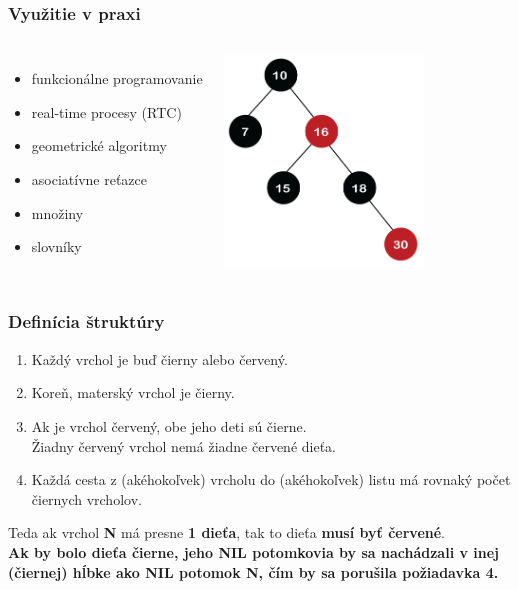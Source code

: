 \documentclass{beamer}
\begin{document}
    \begin{frame}
        \frametitle{Využitie v praxi}
        \begin{columns}
            \begin{itemize}
                \item funkcionálne programovanie
                \item real-time procesy (RTC)
                \item geometrické algoritmy
                \vspace{20pt}
                \item asociatívne reťazce
                \item množiny
                \item slovníky
            \end{itemize}
            \includegraphics[width=150pt]{rbt17}
        \end{columns}
    \end{frame}

    \begin{frame}
        \frametitle{Definícia štruktúry}
        \begin{enumerate}
            \item Každý vrchol je buď čierny alebo červený.
            \item Koreň, materský vrchol je čierny.
            \item Ak je vrchol červený, obe jeho deti sú čierne.\\
            Žiadny červený vrchol nemá žiadne červené dieťa.
            \item Každá cesta z (akéhokoľvek) vrcholu do (akéhokoľvek) listu má rovnaký počet čiernych vrcholov.
        \end{enumerate}
        \vspace{20pt}
        Teda ak vrchol \textbf{N} má presne \textbf{1 dieťa}, tak to dieťa \textbf{musí byť červené}. \\
        \vspace{5pt}
        {\footnotesize{\textbf{Ak by bolo dieťa čierne, jeho NIL potomkovia by sa nachádzali v inej (čiernej) hĺbke ako NIL potomok N, čím by sa porušila požiadavka 4.}}}

        \vspace{15pt}
    \end{frame}
\end{document}
